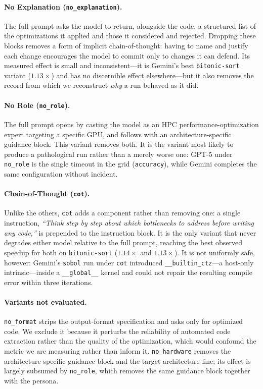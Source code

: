 \paragraph{No Explanation (\texttt{no\_explanation}).}
The full prompt asks the model to return, alongside the code, a structured list of the optimizations it
applied and those it considered and rejected. Dropping these blocks removes a form of implicit
chain-of-thought: having to name and justify each change encourages the model to commit only to changes
it can defend. Its measured effect is small and inconsistent---it is Gemini's best
\texttt{bitonic-sort} variant ($1.13\times$) and has no discernible effect elsewhere---but it also
removes the record from which we reconstruct \emph{why} a run behaved as it did.

\paragraph{No Role (\texttt{no\_role}).}
The full prompt opens by casting the model as an HPC performance-optimization expert targeting a
specific GPU, and follows with an architecture-specific guidance block. This variant removes both.
It is the variant most likely to produce a pathological run rather than a merely worse one: GPT-5 under
\texttt{no\_role} is the single timeout in the grid (\texttt{accuracy}), while Gemini completes the same
configuration without incident.

\paragraph{Chain-of-Thought (\texttt{cot}).}
Unlike the others, \texttt{cot} adds a component rather than removing one: a single instruction,
\textit{``Think step by step about which bottlenecks to address before writing any code,''} is
prepended to the instruction block. It is the only variant that never degrades either model relative to
the full prompt, reaching the best observed speedup for both on \texttt{bitonic-sort}
($1.14\times$ and $1.13\times$). It is not uniformly safe, however: Gemini's \texttt{sobol} run under
\texttt{cot} introduced \texttt{\_\_builtin\_ctz}---a host-only intrinsic---inside a
\texttt{\_\_global\_\_} kernel and could not repair the resulting compile error within three iterations.

\paragraph{Variants not evaluated.}
\texttt{no\_format} strips the output-format specification and asks only for optimized code. We exclude
it because it perturbs the reliability of automated code extraction rather than the quality of the
optimization, which would confound the metric we are measuring rather than inform it.
\texttt{no\_hardware} removes the architecture-specific guidance block and the target-architecture line;
its effect is largely subsumed by \texttt{no\_role}, which removes the same guidance block together with
the persona.
